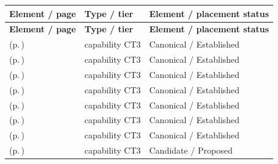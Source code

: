 \begingroup\small\setlength{\TableWidth}{\dimexpr\linewidth-6\tabcolsep-4\arrayrulewidth\relax}
\begin{longtable}{|>{\raggedright\arraybackslash}p{0.52\TableWidth}|>{\raggedright\arraybackslash}p{0.2\TableWidth}|>{\raggedright\arraybackslash}p{0.28\TableWidth}|}
\hline\rowcolor{TableHead}\textbf{Element / page} & \textbf{Type / tier} & \textbf{Element / placement status}\\\hline\endfirsthead
\hline\rowcolor{TableHead}\textbf{Element / page} & \textbf{Type / tier} & \textbf{Element / placement status}\\\hline\endhead
\hline\endfoot
\nameref{cap:bc-clinical-device-inventory-management} (p.\,\pageref{cap:bc-clinical-device-inventory-management}) & capability CT3 & Canonical / Established\\\hline
\nameref{cap:bc-clinical-device-feature-release-management} (p.\,\pageref{cap:bc-clinical-device-feature-release-management}) & capability CT3 & Canonical / Established\\\hline
\nameref{cap:bc-clinical-device-loan-deployment-management} (p.\,\pageref{cap:bc-clinical-device-loan-deployment-management}) & capability CT3 & Canonical / Established\\\hline
\nameref{cap:bc-clinical-device-utilisation-support} (p.\,\pageref{cap:bc-clinical-device-utilisation-support}) & capability CT3 & Canonical / Established\\\hline
\nameref{cap:bc-clinical-device-integration-provision} (p.\,\pageref{cap:bc-clinical-device-integration-provision}) & capability CT3 & Canonical / Established\\\hline
\nameref{cap:bc-clinical-device-data-integration} (p.\,\pageref{cap:bc-clinical-device-data-integration}) & capability CT3 & Canonical / Established\\\hline
\nameref{cap:bc-clinical-device-lifecycle-management} (p.\,\pageref{cap:bc-clinical-device-lifecycle-management}) & capability CT3 & Canonical / Established\\\hline
\nameref{cap:bc-clinical-device-maintenance-management} (p.\,\pageref{cap:bc-clinical-device-maintenance-management}) & capability CT3 & Candidate / Proposed\\\hline
\end{longtable}\endgroup

